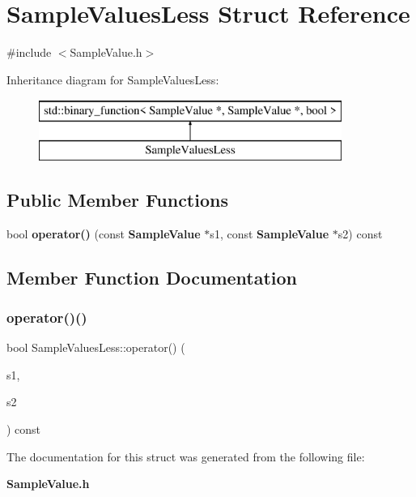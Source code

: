 \section{Sample\+Values\+Less Struct Reference}
\label{structSampleValuesLess}


{\ttfamily \#include $<$Sample\+Value.\+h$>$}

Inheritance diagram for Sample\+Values\+Less\+:\begin{figure}[H]
\begin{center}
\leavevmode
\includegraphics[height=2.000000cm]{structSampleValuesLess}
\end{center}
\end{figure}
\subsection*{Public Member Functions}
\begin{DoxyCompactItemize}
\item 
bool \textbf{ operator()} (const \textbf{ Sample\+Value} $\ast$s1, const \textbf{ Sample\+Value} $\ast$s2) const
\end{DoxyCompactItemize}


\subsection{Member Function Documentation}
\mbox{\label{structSampleValuesLess_ae2eefc0a8a321bf0f50cbe8db15c3907}} 
\subsubsection{operator()()}
{\footnotesize\ttfamily bool Sample\+Values\+Less\+::operator() (\begin{DoxyParamCaption}\item[{const \textbf{ Sample\+Value} $\ast$}]{s1,  }\item[{const \textbf{ Sample\+Value} $\ast$}]{s2 }\end{DoxyParamCaption}) const\hspace{0.3cm}{\ttfamily [inline]}}



The documentation for this struct was generated from the following file\+:\begin{DoxyCompactItemize}
\item 
\textbf{ Sample\+Value.\+h}\end{DoxyCompactItemize}
